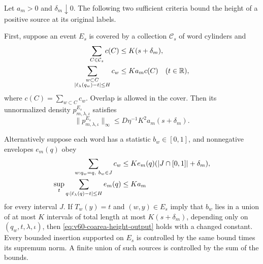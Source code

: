 \begin{proposition}
\label{prop:v60-coarea-height}
Let $a_m>0$ and $\delta_m\downarrow0$. The following two sufficient
criteria bound the height of a positive source at its original labels.

First, suppose an event $E_s$ is covered by a collection $\mathcal C_s$
of word cylinders and
\begin{align}
 \sum_{C\in\mathcal C_s}c(C)&\le K(s+\delta_m),\notag\\
 \sum_{\substack{w\subset C\\
       |\ell_\lambda(q_w)-t|\le H}}c_w
       &\le K a_m c(C)\quad(t\in\R),
                                                        \label{eq:v60-cylinder-height-input}
\end{align}
where $c(C)=\sum_{w\subset C}c_w$. Overlap is allowed in the cover.
Then its unnormalized density $p^{E_s}_{m,\lambda,\iota}$ satisfies
\begin{equation}\label{eq:v60-coarea-height-output}
 \|p^{E_s}_{m,\lambda,\iota}\|_\infty
                \le D\eta^{-1}K^2a_m(s+\delta_m).
\end{equation}

Alternatively suppose each word has a statistic $b_w\in[0,1]$, and
nonnegative envelopes $e_m(q)$ obey
\begin{align}
 \sum_{w:q_w=q,\ b_w\in J}c_w
     &\le K e_m(q)(|J\cap[0,1]|+\delta_m),\notag\\
 \sup_t\sum_{q:|\ell_\lambda(q)-t|\le H}e_m(q)&\le K a_m
                                                        \label{eq:v60-endpoint-height-input}
\end{align}
for every interval $J$. If $T_w(y)=t$ and $(w,y)\in E_s$ imply that
$b_w$ lies in a union of at most $K$ intervals of total length at most
$K(s+\delta_m)$, depending only on $(q_w,t,\lambda,\iota)$, then
\eqref{eq:v60-coarea-height-output} holds with a changed constant.
Every bounded insertion supported on $E_s$ is controlled by the same
bound times its supremum norm. A finite union of such sources is
controlled by the sum of the bounds.
\end{proposition}
